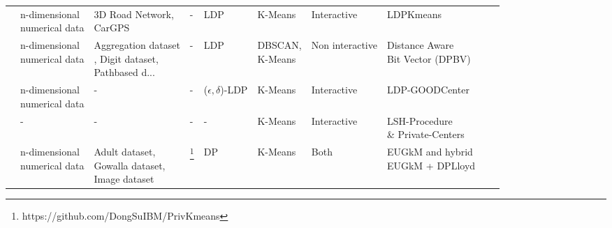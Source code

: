 \begin{landscape}
\begin{table}[ht]
\begin{tabular}{rlllllllll}
            \citep{xia_distributed_2020}               & \makecell[l]{n-dimensional                                                                                                                          \\ numerical data}      & \makecell[l]{3D Road Network, \\ CarGPS}                           & -                                                  & LDP                      & K-Means             & Interactive     & LDPKmeans                        \\
            \citep{sun_distributed_2019}               & \makecell[l]{n-dimensional                                                                                                                          \\ numerical data}     & \makecell[l]{Aggregation dataset \\, Digit dataset, \\ Pathbased d...} & -                                                  & LDP                      & \makecell[l]{DBSCAN,\\  K-Means}     & Non interactive & \makecell[l]{Distance Aware \\ Bit Vector (DPBV)} \\
            \citep{nissim_clustering_2018}             & \makecell[l]{n-dimensional                                                                                                                          \\ numerical data}      & -                                                  & -                                                  & ($\epsilon, \delta$)-LDP & K-Means             & Interactive     & LDP-GOODCenter                   \\
            \citep{nissim_clustering_2018}             & -                          & -                           & -    & -                        & K-Means & Interactive     & \makecell[l]{LSH-Procedure \\ \& Private-Centers} \\
            \citep{su_differentially_2015}             & \makecell[l]{n-dimensional                                                                                                                          \\ numerical data} & \makecell[l]{Adult dataset, \\ Gowalla dataset, \\ Image dataset} & \footnote{https://github.com/DongSuIBM/PrivKmeans} & DP                       & K-Means             & Both            & \makecell[l]{EUGkM and hybrid \\ EUGkM + DPLloyd} \\

\end{tabular}
\end{table}
\end{landscape}
